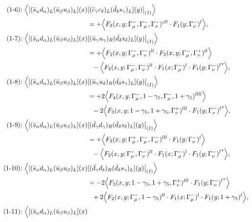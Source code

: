 \begin{align}
\mbox{(1-6):}\ 
\Big\langle
[(\bar s_\alpha d_\alpha)_L(\bar u_\beta u_\beta)_L](x)&
[(\bar c_\gamma c_\delta)_L(\bar d_\delta s_\gamma)_L](y)\big|_{(I)}
\Big\rangle
\notag\\*
&=
 + \Big\langle F_3(x,y;\Gamma_\mu^-,\Gamma_\mu^-,\Gamma_\nu^-)^{cll} \cdot F_1(y;\Gamma_\nu^-)^l\Big\rangle,
\\
\mbox{(1-7):}\ 
\Big\langle
[(\bar s_\alpha d_\alpha)_L(\bar u_\beta u_\beta)_L](x)&
[(\bar u_\gamma u_\gamma)_R(\bar d_\delta s_\delta)_L](y)\big|_{(I)}
\Big\rangle
\notag\\*
&=
 + \Big\langle F_2(x,y;\Gamma_\mu^-,\Gamma_\nu^-)^{ll} \cdot F_2(x,y;\Gamma_\mu^-,\Gamma_\nu^+)^{ll}\Big\rangle
\notag\\*&\ \ 
 - \Big\langle F_2(x,y;\Gamma_\mu^-,\Gamma_\nu^-)^{ll} \cdot F_1(x;\Gamma_\mu^-)^l \cdot {F_1(y;\Gamma_\nu^-)^l}^*\Big\rangle,
\\
\mbox{(1-8):}\ 
\Big\langle
[(\bar s_\alpha d_\alpha)_L(\bar u_\beta u_\beta)_L](x)&
[(\bar u_\gamma u_\delta)_R(\bar d_\delta s_\gamma)_L](y)\big|_{(I)}
\Big\rangle
\notag\\*
&=
 + 2\Big\langle F_4(x,y;\Gamma_\mu^-,1-\gamma_5,\Gamma_\mu^-,1+\gamma_5)^{llll}\Big\rangle
\notag\\*&\ \ 
-2\Big\langle F_3(x,y;1-\gamma_5,1+\gamma_5,\Gamma_\nu^+)^{lll} \cdot {F_1(y;\Gamma_\nu^-)^l}^*\Big\rangle,
\\
\mbox{(1-9):}\ 
\Big\langle
[(\bar s_\alpha d_\alpha)_L(\bar u_\beta u_\beta)_L](x)&
[(\bar d_\gamma d_\gamma)_R(\bar d_\delta s_\delta)_L](y)\big|_{(I)}
\Big\rangle
\notag\\*
&=
 + \Big\langle F_3(x,y;\Gamma_\mu^+,\Gamma_\mu^-,\Gamma_\nu^-)^{lll} \cdot F_1(y;\Gamma_\nu^-)^l\Big\rangle
\notag\\*&\ \ 
 - \Big\langle F_2(x,y;\Gamma_\mu^-,\Gamma_\nu^-)^{ll} \cdot F_1(x;\Gamma_\mu^-)^l \cdot {F_1(y;\Gamma_\nu^-)^l}^*\Big\rangle,
\\
\mbox{(1-10):}\ 
\Big\langle
[(\bar s_\alpha d_\alpha)_L(\bar u_\beta u_\beta)_L](x)&
[(\bar d_\gamma d_\delta)_R(\bar d_\delta s_\gamma)_L](y)\big|_{(I)}
\Big\rangle
\notag\\*
&=
-2\Big\langle F_3(x,y;1-\gamma_5,1+\gamma_5,\Gamma_\nu^+)^{lll} \cdot {F_1(y;\Gamma_\nu^-)^l}^*\Big\rangle
\notag\\*&\ \ 
 + 2\Big\langle F_2(x,y;\Gamma_\mu^-,1-\gamma_5)^{ll} \cdot F_1(x;\Gamma_\mu^-)^l \cdot F_1(y;1+\gamma_5)^l\Big\rangle,
\\
\mbox{(1-11):}\ 
\Big\langle
[(\bar s_\alpha d_\alpha)_L(\bar u_\beta u_\beta)_L](x)&

\end{align}
